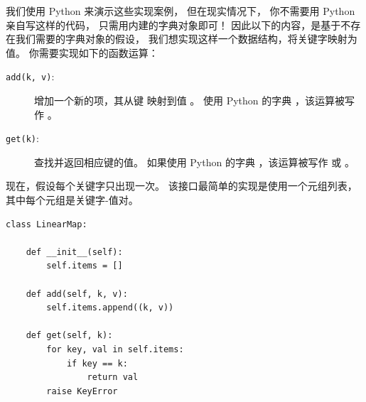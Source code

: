 
我们使用 Python 来演示这些实现案例， 但在现实情况下，
你不需要用 Python 亲自写这样的代码， 只需用内建的字典对象即可！
因此以下的内容，是基于不存在我们需要的字典对象的假设，
我们想实现这样一个数据结构，将关键字映射为值。 你需要实现如下的函数运算：


\begin{description}

\item [{\tt add(k, v)}:] 增加一个新的项，其从键  映射到值 。
使用 Python 的字典 ，该运算被写作 。

\item [{\tt get(k)}:] 查找并返回相应键的值。
如果使用 Python 的字典  ，该运算被写作  或 。

\end{description}


现在，假设每个关键字只出现一次。
该接口最简单的实现是使用一个元组列表， 其中每个元组是关键字-值对。

\begin{lstlisting}
class LinearMap:

    def __init__(self):
        self.items = []

    def add(self, k, v):
        self.items.append((k, v))

    def get(self, k):
        for key, val in self.items:
            if key == k:
                return val
        raise KeyError
\end{lstlisting}


